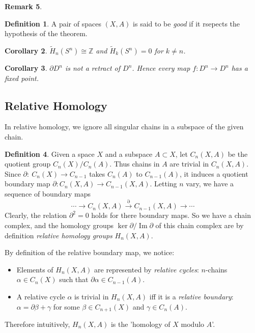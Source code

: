 \documentclass[11pt,a4paper]{article}
\theoremstyle{definition}
\newtheorem{definition}{Definition}[section]
\newtheorem{remark}[definition]{Remark}
\theoremstyle{plain}
\newtheorem{corollary}[definition]{Corollary}
\theoremstyle{remark}
\begin{document}
\begin{remark}
\begin{definition}
  A pair of spaces $(X,A)$ is said to be \emph{good} if it rsepects the hypothesis of the theorem.
\end{definition}

\begin{corollary}
  $\tilde{H}_n (S^n) \cong \mathbb{Z}$ and $\tilde{H}_k (S^n) = 0$ for $k \neq n$. 
\end{corollary}

\begin{corollary}
  $\partial D^n$ is not a retract of $D^n$. Hence every map $f \colon D^n \to D^n$ has a fixed 
  point. 
\end{corollary}

\subsection{Relative Homology}
In relative homology, we ignore all singular chains in a subspace of the 
given chain. 

\begin{definition}
  Given a space $X$ and a subspace $A \subset X$, let $C_n(X,A)$ be the quotient group 
  $C_n(X) / C_n(A)$. Thus chains in $A$ are trivial in $C_n(X,A)$. 
  Since $\partial \colon \: C_n(X) \to C_{n-1}$ takes $C_n (A)$ to $C_{n-1} (A)$, 
  it induces a quotient boundary map $\partial \colon C_{n} (X, A) \to C_{n-1} (X,A)$. 
  Letting $n$ vary, we have a sequence of boundary maps 
  $$ \cdots \to C_n (X, A) \xrightarrow{\partial} C_{n-1} (X,A) \to \cdots$$
  Clearly, the relation $\partial^2 = 0$ holds for there boundary maps. So we have a 
  chain complex, and the homology groups $\ker \partial / \operatorname{Im} \partial$ of this 
  chain  complex are by definition \emph{relative homology groups} $H_n(X,A)$. 
\end{definition}

By definition of the relative boundary map, we notice: 
\begin{itemize}
  \item Elements of $H_n(X,A)$ are represented by \emph{relative cycles}: $n$-chains $\alpha \in C_n(X)$ such that 
  $\partial \alpha \in C_{n-1} (A)$. 
  \item A relative cycle $\alpha$ is trivial in $H_n(X,A)$ iff it is a 
  \emph{relative boundary}: $\alpha = \partial \beta + \gamma$ for some $\beta \in C_{n+1} (X)$ and $\gamma \in C_n (A)$. 
\end{itemize}
Therefore intuitively, $H_n(X,A)$ is the 'homology of $X$ modulo $A$'. 


\end{remark}
\end{document}
